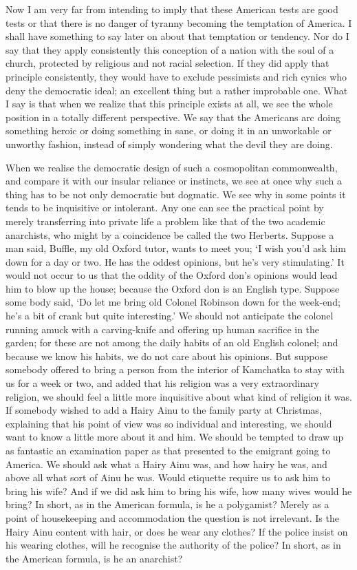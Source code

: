 \documentclass{book}
\begin{document}
Now I am very far from intending to imply that these American tests are good tests or that there is no danger of tyranny becoming the temptation of America. I shall have something to say later on about that temptation or tendency. Nor do I say that they apply consistently this conception of a nation with the soul of a church, protected by religious and not racial selection. If they did apply that principle consistently, they would have to exclude pessimists and rich cynics who deny the democratic ideal; an excellent thing but a rather improbable one. What I say is that when we realize that this principle exists at all, we see the whole position in a totally different perspective. We say that the Americans arc doing something heroic or doing something in sane, or doing it in an unworkable or unworthy fashion, instead of simply wondering what the devil they are doing.

When we realise the democratic design of such a cosmopolitan commonwealth, and compare it with our insular reliance or instincts, we see at once why such a thing has to be not only democratic but dogmatic. We see why in some points it tends to be inquisitive or intolerant. Any one can see the practical point by merely transferring into private life a problem like that of the two academic anarchists, who might by a coincidence be called the two Herberts. Suppose a man said, Buffle, my old Oxford tutor, wants to meet you; ‘I wish you’d ask him down for a day or two. He has the oddest opinions, but he’s very stimulating.’ It would not occur to us that the oddity of the Oxford don’s opinions would lead him to blow up the house; because the Oxford don is an English type. Suppose some body said, ‘Do let me bring old Colonel Robinson down for the week-end; he’s a bit of crank but quite interesting.’ We should not anticipate the colonel running amuck with a carving-knife and offering up human sacrifice in the garden; for these are not among the daily habits of an old English colonel; and because we know his habits, we do not care about his opinions. But suppose somebody offered to bring a person from the interior of Kamchatka to stay with us for a week or two, and added that his religion was a very extraordinary religion, we should feel a little more inquisitive about what kind of religion it was. If somebody wished to add a Hairy Ainu to the family party at Christmas, explaining that his point of view was so individual and interesting, we should want to know a little more about it and him. We should be tempted to draw up as fantastic an examination paper as that presented to the emigrant going to America. We should ask what a Hairy Ainu was, and how hairy he was, and above all what sort of Ainu he was. Would etiquette require us to ask him to bring his wife? And if we did ask him to bring his wife, how many wives would he bring? In short, as in the American formula, is he a polygamist? Merely as a point of housekeeping and accommodation the question is not irrelevant. Is the Hairy Ainu content with hair, or does he wear any clothes? If the police insist on his wearing clothes, will he recognise the authority of the police? In short, as in the American formula, is he an anarchist?
\end{document}
